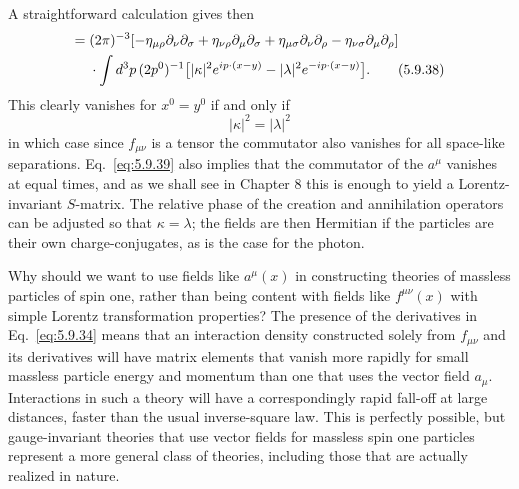 A straightforward calculation gives then
\begin{align}
[f_{\mu\nu}(x),f_{\rho\sigma}(y)^\dagger]
={}&(2\pi)^{-3}
[-\eta_{\mu\rho}\partial_\nu\partial_\sigma
+\eta_{\nu\rho}\partial_\mu\partial_\sigma
+\eta_{\mu\sigma}\partial_\nu\partial_\rho
-\eta_{\nu\sigma}\partial_\mu\partial_\rho]
\notag\\
&\cdot\int d^3p\,(2p^0)^{-1}
\bigl[|\kappa|^2e^{ip\cdot(x-y)}-|\lambda|^2e^{-ip\cdot(x-y)}\bigr].
\tag{5.9.38}\label{eq:5.9.38}
\end{align}
This clearly vanishes for $x^0=y^0$ if and only if
\begin{equation}
|\kappa|^2=|\lambda|^2
\tag{5.9.39}\label{eq:5.9.39}
\end{equation}
in which case since $f_{\mu\nu}$ is a tensor the commutator also vanishes for
all space-like separations. Eq.~\eqref{eq:5.9.39} also implies that the commutator of
the $a^\mu$ vanishes at equal times, and as we shall see in Chapter 8 this is
enough to yield a Lorentz-invariant $S$-matrix. The relative phase of the
creation and annihilation operators can be adjusted so that $\kappa=\lambda$;
the fields are then Hermitian if the particles are their own
charge-conjugates, as is the case for the photon.

Why should we want to use fields like $a^\mu(x)$ in constructing theories of
massless particles of spin one, rather than being content with fields like
$f^{\mu\nu}(x)$ with simple Lorentz transformation properties? The presence of
the derivatives in Eq.~\eqref{eq:5.9.34} means that an interaction density constructed
solely from $f_{\mu\nu}$ and its derivatives will have matrix elements that
vanish more rapidly for small massless particle energy and momentum than one
that uses the vector field $a_\mu$. Interactions in such a theory will have a
correspondingly rapid fall-off at large distances, faster than the usual
inverse-square law. This is perfectly possible, but gauge-invariant theories
that use vector fields for massless spin one particles represent a more
general class of theories, including those that are actually realized in
nature.

